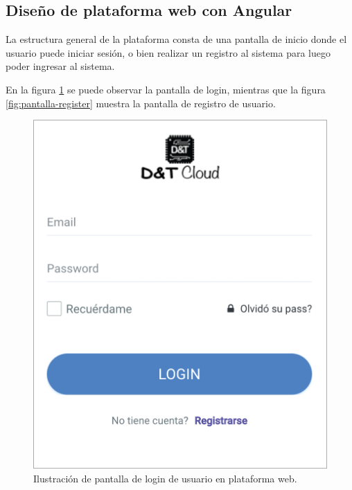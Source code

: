 \subsection{Diseño de plataforma web con Angular}

La estructura general de la plataforma consta de una pantalla de inicio donde el usuario puede iniciar sesión, o bien realizar un registro al sistema para luego poder ingresar al sistema. 

En la figura \ref{fig:pantalla-login} se puede observar la pantalla de login, mientras que la figura \ref{fig:pantalla-register} muestra la pantalla de registro de usuario. 

\begin{figure}[htpb]
	\centering
	\includegraphics[scale=.60]{./Figures/pantalla-login.png}
	\caption[Pantalla de login de usuario]{Ilustración de pantalla de login de usuario en plataforma web.}
	\label{fig:pantalla-login}
\end{figure}
\pagebreak
